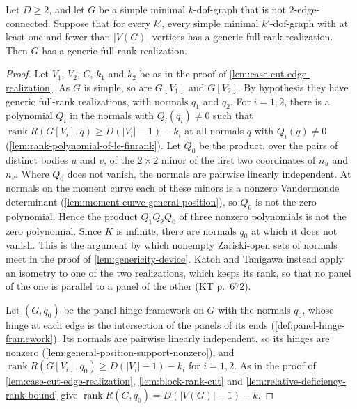 \begin{lemma}
  \label{lem:case-cut-edge-realization-gp}
  \leanok
  Let $D \ge 2$, and let $G$ be a simple minimal $k$-dof-graph that is
  not $2$-edge-connected. Suppose that for every $k'$, every simple
  minimal $k'$-dof-graph with at least one and fewer than $|V(G)|$
  vertices has a generic full-rank realization. Then $G$ has a generic
  full-rank realization.
\end{lemma}
\begin{proof}
  \leanok
  Let $V_1$, $V_2$, $C$, $k_1$ and $k_2$ be as in the proof of
  \cref{lem:case-cut-edge-realization}. As $G$ is simple, so are
  $G[V_1]$ and $G[V_2]$. By hypothesis they have generic full-rank
  realizations, with normals $q_1$ and $q_2$. For $i = 1, 2$, there is a
  polynomial $Q_i$ in the normals with $Q_i(q_i) \neq 0$ such that
  $\operatorname{rank} R(G[V_i], q) \ge D(|V_i| - 1) - k_i$ at all
  normals $q$ with $Q_i(q) \neq 0$
  (\cref{lem:rank-polynomial-of-le-finrank}). Let $Q_0$ be the product,
  over the pairs of distinct bodies $u$ and $v$, of the $2 \times 2$
  minor of the first two coordinates of $n_u$ and $n_v$. Where $Q_0$
  does not vanish, the normals are pairwise linearly independent. At
  normals on the moment curve each of these minors is a nonzero
  Vandermonde determinant (\cref{lem:moment-curve-general-position}), so
  $Q_0$ is not the zero polynomial. Hence the product $Q_1 Q_2 Q_0$ of
  three nonzero polynomials is not the zero polynomial. Since $K$ is
  infinite, there are normals $q_0$ at which it does not vanish. This is
  the argument by which nonempty Zariski-open sets of normals meet in
  the proof of \cref{lem:genericity-device}. Katoh and Tanigawa instead
  apply an isometry to one of the two realizations, which keeps its
  rank, so that no panel of the one is parallel to a panel of the other
  (KT p.~672).

  Let $(G, q_0)$ be the panel-hinge framework on $G$ with the normals
  $q_0$, whose hinge at each edge is the intersection of the panels of
  its ends (\cref{def:panel-hinge-framework}). Its normals are pairwise
  linearly independent, so its hinges are nonzero
  (\cref{lem:general-position-support-nonzero}), and
  $\operatorname{rank} R(G[V_i], q_0) \ge D(|V_i| - 1) - k_i$ for
  $i = 1, 2$. As in the proof of \cref{lem:case-cut-edge-realization},
  \cref{lem:block-rank-cut} and \cref{lem:relative-deficiency-rank-bound}
  give $\operatorname{rank} R(G, q_0) = D(|V(G)| - 1) - k$.
\end{proof}
